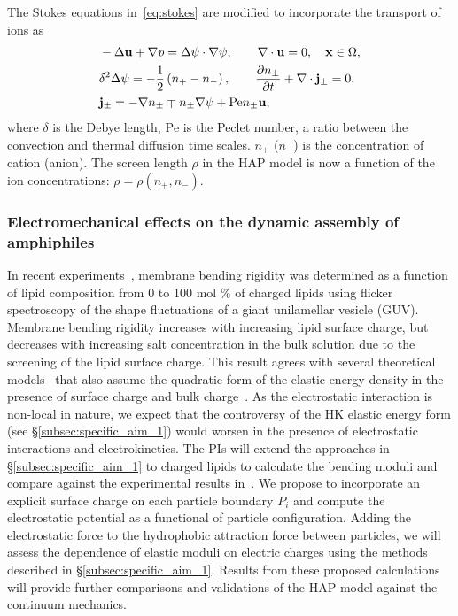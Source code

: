 The Stokes equations in~\eqref{eq:stokes} are modified to incorporate the transport of ions as
\begin{equation}
\label{eq:stokes}
\begin{aligned}
  &-\Delta \mathbf{u} + \nabla p = \Delta\psi\cdot\nabla\psi, \qquad
  \nabla \cdot \mathbf{u} = 0,  \quad \mathbf{x} \in \Omega,\\
  &\delta^2\Delta\psi = -\frac{1}{2}\left(n_+-n_-\right),\qquad
  \frac{\partial n_{\pm}}{\partial t} + \nabla\cdot{\bf j}_{\pm} = 0,\\
  &{\bf j}_{\pm} = -\nabla n_{\pm} \mp n_{\pm} \nabla\psi + \mbox{Pe} n_{\pm}\mathbf{u},
\end{aligned}
\end{equation}
where $\delta$ is the Debye length, $\mbox{Pe}$ is the Peclet number, a ratio between the convection and  thermal diffusion time scales.
$n_{+}$ ($n_{-}$) is the concentration of cation (anion).
The screen length $\rho$ in the HAP model is now a function of the ion concentrations: $\rho = \rho(n_+,n_-)$. 






\subsubsection{Electromechanical effects on the dynamic assembly of amphiphiles \label{subsubsec:em_effects}}
In recent experiments~\cite{FaizEtAl2019_SoftMatt}, membrane bending
rigidity was determined as a function of lipid composition from 0 to 100
mol $\%$ of charged lipids using flicker spectroscopy of the shape
fluctuations of a giant unilamellar vesicle (GUV).
Membrane bending rigidity increases with increasing lipid surface
charge, but decreases with increasing salt concentration in the bulk
solution due to the screening of the lipid surface charge. This
result agrees
with several theoretical models~\cite{Kralchevsky1996_JCIS,
May1996_JChemPhys, LoubetEtAl2013_PRE} that also assume the quadratic
form of the elastic energy density in the presence of surface charge and
bulk charge~\cite{DuplantierGoldstein1990_PRL, Winterhalter1992_JPC}. As
the electrostatic interaction is non-local in nature, we expect that the
controversy of the HK elastic energy form (see
\S\ref{subsec:specific_aim_1}) would worsen in the presence of
electrostatic interactions and electrokinetics. The PIs will extend the
approaches in \S\ref{subsec:specific_aim_1} to charged lipids to
calculate the bending moduli and compare against the experimental
results in~\cite{FaizEtAl2019_SoftMatt}. We propose to incorporate an
explicit surface charge on each particle boundary $P_i$ and compute the
electrostatic potential as a functional of particle configuration.
Adding the electrostatic force to the hydrophobic attraction force
between particles, we will assess the dependence of elastic moduli on
electric charges using the methods described in
\S\ref{subsec:specific_aim_1}. Results from these proposed calculations
will provide further comparisons and validations of the HAP model
against the continuum mechanics.

